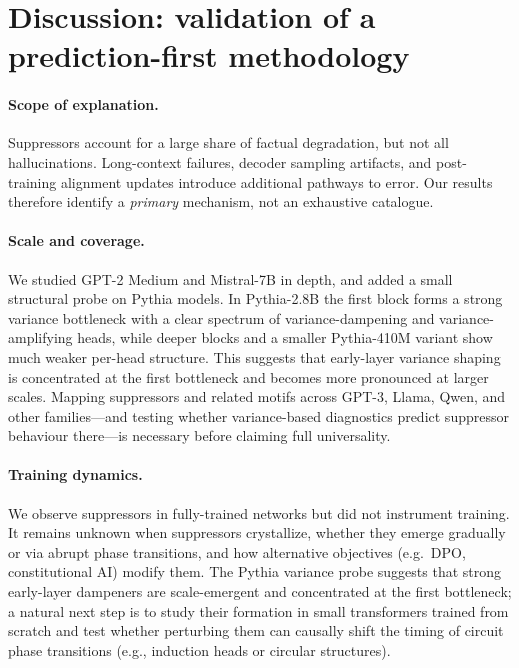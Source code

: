 \section{Discussion: validation of a prediction-first methodology}

\paragraph{Scope of explanation.}
Suppressors account for a large share of factual degradation, but not all hallucinations.
Long-context failures, decoder sampling artifacts, and post-training alignment updates introduce additional pathways to error.
Our results therefore identify a \emph{primary} mechanism, not an exhaustive catalogue.

\paragraph{Scale and coverage.}
We studied GPT-2 Medium and Mistral-7B in depth, and added a small structural probe on Pythia models.
In Pythia-2.8B the first block forms a strong variance bottleneck with a clear spectrum of variance-dampening and variance-amplifying heads, while deeper blocks and a smaller Pythia-410M variant show much weaker per-head structure.
This suggests that early-layer variance shaping is concentrated at the first bottleneck and becomes more pronounced at larger scales.
Mapping suppressors and related motifs across GPT-3, Llama, Qwen, and other families---and testing whether variance-based diagnostics predict suppressor behaviour there---is necessary before claiming full universality.

\paragraph{Training dynamics.}
We observe suppressors in fully-trained networks but did not instrument training.
It remains unknown when suppressors crystallize, whether they emerge gradually or via abrupt phase transitions, and how alternative objectives (e.g.\ DPO, constitutional AI) modify them.
The Pythia variance probe suggests that strong early-layer dampeners are scale-emergent and concentrated at the first bottleneck; a natural next step is to study their formation in small transformers trained from scratch and test whether perturbing them can causally shift the timing of circuit phase transitions (e.g., induction heads or circular structures).

